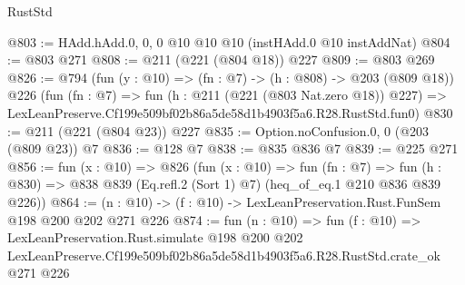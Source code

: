 \begin{lexlean}{RustStd}
\begin{coremodule}
@803 := HAdd.hAdd.{0, 0, 0} @10 @10 @10 (instHAdd.{0} @10 instAddNat)
@804 := @803 @271
@808 := @211 (@221 (@804 @18)) @227
@809 := @803 @269
@826 := @794
    (fun (y : @10) => (fn : @7) -> (h : @808) -> @203 (@809 @18))
    @226
    (fun (fn : @7) =>
    fun (h : @211 (@221 (@803 Nat.zero @18)) @227) =>
    LexLeanPreserve.Cf199e509bf02b86a5de58d1b4903f5a6.R28.RustStd.fun0)
@830 := @211 (@221 (@804 @23)) @227
@835 := Option.noConfusion.{0, 0} (@203 (@809 @23)) @7
@836 := @128 @7
@838 := @835 @836 @7
@839 := @225 @271
@856 := fun (x : @10) =>
  @826
    (fun (x : @10) =>
    fun (fn : @7) =>
    fun (h : @830) => @838 @839 (Eq.refl.{2} (Sort 1) @7) (heq_of_eq.{1} @210 @836 @839 @226))
@864 := (n : @10) -> (f : @10) -> LexLeanPreservation.Rust.FunSem @198 @200 @202 @271 @226
@874 := fun (n : @10) =>
  fun (f : @10) =>
  LexLeanPreservation.Rust.simulate
    @198
    @200
    @202
    LexLeanPreserve.Cf199e509bf02b86a5de58d1b4903f5a6.R28.RustStd.crate_ok
    @271
    @226
\end{coremodule}
\end{lexlean}
